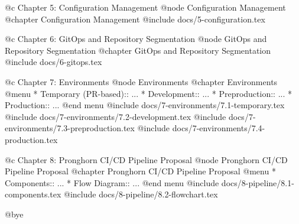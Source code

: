 @c Chapter 5: Configuration Management
@node Configuration Management
@chapter Configuration Management
@include docs/5-configuration.tex


@c Chapter 6: GitOps and Repository Segmentation
@node GitOps and Repository Segmentation
@chapter GitOps and Repository Segmentation
@include docs/6-gitops.tex


@c Chapter 7: Environments
@node Environments
@chapter Environments
@menu
* Temporary (PR-based):: ...
* Development:: ...
* Preproduction:: ...
* Production:: ...
@end menu
@include docs/7-environments/7.1-temporary.tex
@include docs/7-environments/7.2-development.tex
@include docs/7-environments/7.3-preproduction.tex
@include docs/7-environments/7.4-production.tex


@c Chapter 8: Pronghorn CI/CD Pipeline Proposal
@node Pronghorn CI/CD Pipeline Proposal
@chapter Pronghorn CI/CD Pipeline Proposal
@menu
* Components:: ...
* Flow Diagram:: ...
@end menu
@include docs/8-pipeline/8.1-components.tex
@include docs/8-pipeline/8.2-flowchart.tex


@bye
